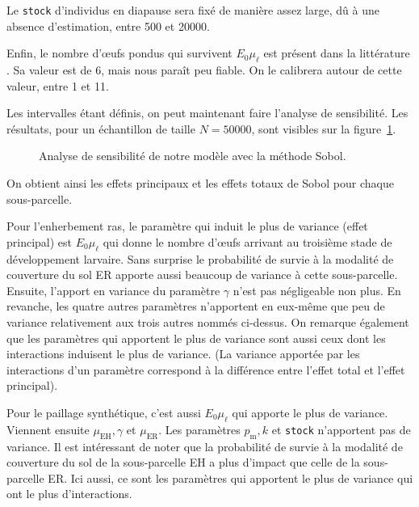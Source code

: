 Le \texttt{stock} d'individus en diapause sera fixé de manière assez large, dû à une absence d'estimation, entre 500 et 20000.

Enfin, le nombre d'œufs pondus qui survivent $E_0\mu_\ell$ est présent dans la littérature \citep{paul}.
Sa valeur est de 6, mais nous paraît peu fiable.
On le calibrera autour de cette valeur, entre 1 et 11.

Les intervalles étant définis, on peut maintenant faire l'analyse de sensibilité. Les résultats, pour un échantillon de taille $N = 50000$, sont visibles sur la figure~\ref{fig:sa}.

\begin{figure}
 \centering
 \caption{Analyse de sensibilité de notre modèle avec la méthode Sobol.}
 \label{fig:sa}
\end{figure}

On obtient ainsi les effets principaux et les effets totaux de Sobol pour chaque sous-parcelle.

Pour l'enherbement ras, le paramètre qui induit le plus de variance (effet principal) est $E_0\mu_\ell$ qui donne le nombre d'œufs arrivant au troisième stade de développement larvaire.
Sans surprise le probabilité de survie à la modalité de couverture du sol ER apporte aussi beaucoup de variance à cette sous-parcelle.
Ensuite, l'apport en variance du paramètre $\gamma$ n'est pas négligeable non plus.
En revanche, les quatre autres paramètres n'apportent en eux-même que peu de variance relativement aux trois autres nommés ci-dessus.
On remarque également que les paramètres qui apportent le plus de variance sont aussi ceux dont les interactions induisent le plus de variance.
(La variance apportée par les interactions d'un paramètre correspond à la différence entre l'effet total et l'effet principal).

Pour le paillage synthétique, c'est aussi $E_0\mu_\ell$ qui apporte le plus de variance.
Viennent ensuite $\mu_{\text{EH}}, \gamma$ et $\mu_{\text{ER}}$.
Les paramètres $p_{\text{m}}, k$ et \texttt{stock} n'apportent pas de variance.
Il est intéressant de noter que la probabilité de survie à la modalité de couverture du sol de la sous-parcelle EH a plus d'impact que celle de la sous-parcelle ER.
Ici aussi, ce sont les paramètres qui apportent le plus de variance qui ont le plus d'interactions.


